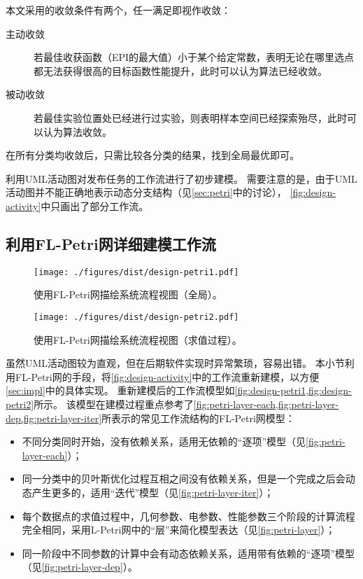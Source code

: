 \documentclass[index]{subfiles}
\begin{document}
本文采用的收敛条件有两个，任一满足即视作收敛：
\begin{description}
  \item[主动收敛] 若最佳收获函数（EPI的最大值）小于某个给定常数，表明无论在哪里选点都无法获得很高的目标函数性能提升，此时可以认为算法已经收敛。
  \item[被动收敛] 若最佳实验位置处已经进行过实验，则表明样本空间已经探索殆尽，此时可以认为算法收敛。
\end{description}

在所有分类均收敛后，只需比较各分类的结果，找到全局最优即可。

利用UML活动图对发布任务的工作流进行了初步建模。
需要注意的是，由于UML活动图并不能正确地表示动态分支结构（见\cref{sec:petri}中的讨论），
\cref{fig:design-activity}中只画出了部分工作流。

\subsection{利用FL-Petri网详细建模工作流}
\begin{figure}[h]
  \centering
  \texttt{[image: ./figures/dist/design-petri1.pdf]}
  \caption[系统流程视图（全局）]{使用FL-Petri网描绘系统流程视图（全局）。\label{fig:design-petri1}}
\end{figure}
\begin{figure}[h]
  \centering
  \texttt{[image: ./figures/dist/design-petri2.pdf]}
  \caption[系统流程视图（局部）]{使用FL-Petri网描绘系统流程视图（求值过程）。\label{fig:design-petri2}}
\end{figure}
虽然UML活动图较为直观，但在后期软件实现时异常繁琐，容易出错。
本小节利用FL-Petri网的手段，将\cref{fig:design-activity}中的工作流重新建模，以方便\cref{sec:impl}中的具体实现。
重新建模后的工作流模型如\cref{fig:design-petri1,fig:design-petri2}所示。
该模型在建模过程重点参考了\cref{fig:petri-layer-each,fig:petri-layer-dep,fig:petri-layer-iter}所表示的常见工作流结构的FL-Petri网模型：
\begin{itemize}
  \item 不同分类同时开始，没有依赖关系，适用无依赖的“逐项”模型（见\cref{fig:petri-layer-each}）；
  \item 同一分类中的贝叶斯优化过程互相之间没有依赖关系，但是一个完成之后会动态产生更多的，适用“迭代”模型（见\cref{fig:petri-layer-iter}）；
  \item 每个数据点的求值过程中，几何参数、电参数、性能参数三个阶段的计算流程完全相同，采用L-Petri网中的“层”来简化模型表达（见\cref{fig:petri-layer}）；
  \item 同一阶段中不同参数的计算中会有动态依赖关系，适用带有依赖的“逐项”模型（见\cref{fig:petri-layer-dep}）。
\end{itemize}
\end{document}
